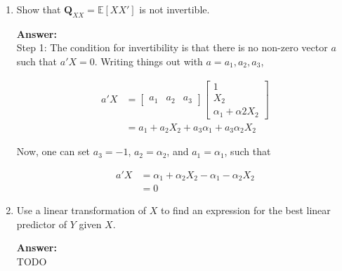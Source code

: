 \documentclass[14pt]{extreport}
\newcommand{\answer}[0]{\medskip \textbf{Answer:} \medskip \\}
\begin{document}
\begin{enumerate}
    \begin{enumerate}
        \item Show that \( \mathbf{Q}_{XX} = \mathbb{E}[XX'] \) is not invertible.
        
        \answer
        Step 1: The condition for invertibility is that there is no non-zero vector \( a \) such that \( a'X = 0 \). Writing things out with \( a = a_1, a_2, a_3 \),

        \begin{align*}
            a'X &= \begin{bmatrix}
                a_1 & a_2 & a_3 
            \end{bmatrix} \begin{bmatrix}
                1 \\
                X_2 \\
                \alpha_1 + \alpha2 X_2
            \end{bmatrix} \\
            &= a_1 + a_2X_2 + a_3\alpha_1 + a_3\alpha_2 X_2
        \end{align*}

        Now, one can set \( a_3 = -1 \), \( a_2 = \alpha_2 \), and \( a_1 = \alpha_1 \), such that

        \begin{align*}
            a'X &= \alpha_1 + \alpha_2X_2 - \alpha_1 - \alpha_2 X_2 \\
            &= 0
        \end{align*}

        \item Use a linear transformation of \( X \) to find an expression for the best linear predictor of \( Y \) given \( X \). 
        
        \answer
        TODO
        
    \end{enumerate}

\end{enumerate}
\end{document}
